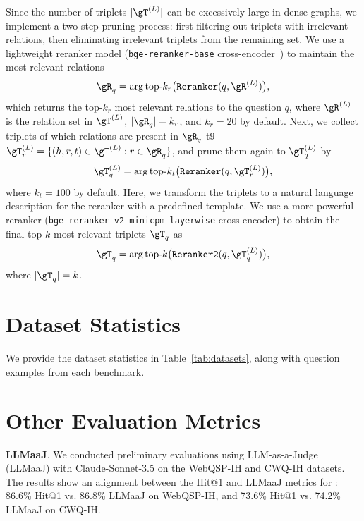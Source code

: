 Since the number of triplets $|\gT^{(L)}|$ can be excessively large in dense graphs, we implement a two-step pruning process: first filtering out triplets with irrelevant relations, then eliminating irrelevant triplets from the remaining set. We use a lightweight reranker model (\texttt{bge-reranker-base} cross-encoder~\citep{bge_embedding}) to maintain the most relevant relations
\begin{equation}
    \gR_{q} = \arg \text{top-}k_r\big(\texttt{Reranker}(q, \gR^{(L)})\big),
\end{equation}
which returns the top-$k_r$ most relevant relations to the question $q$, where $\gR^{(L)}$ is the relation set in $\gT^{(L)}$, $|\gR_{q}| = k_r$, and  $k_r = 20$ by default. 
Next, we collect triplets  of which relations are present in $\gR_{q}$ t9 $\gT_r^{(L)} = \{(h,r,t) \in \gT^{(L)}: r \in \gR_{q}\} $, and prune them again to $\gT_q^{(L)}$ by
\begin{equation}
    \gT_q^{(L)} = \arg \text{top-}k_t\big(\texttt{Reranker}(q, \gT_r^{(L)})\big),
\end{equation}
where $k_t = 100$ by default. Here, we transform the triplets to a natural language description for the reranker with a predefined template.
We use a more powerful reranker (\texttt{bge-reranker-v2-minicpm-layerwise} cross-encoder) to obtain the final top-$k$ most relevant triplets $\gT_q$ as
\begin{equation}
    \gT_{q} = \arg \text{top-}k \big(\texttt{Reranker2}(q, \gT_q^{(L)})\big),
\end{equation}
where $|\gT_{q}| = k$.










\section{Dataset Statistics}
\label{app:data}

We provide the dataset statistics in Table~\ref{tab:datasets}, along with question examples from each benchmark.

\section{Other Evaluation Metrics}

\textbf{LLMaaJ}. We conducted preliminary evaluations using LLM-as-a-Judge (LLMaaJ) with Claude-Sonnet-3.5 on the WebQSP-IH and CWQ-IH datasets. The results show an alignment between the Hit@1 and LLMaaJ metrics for \byokg: 86.6\% Hit@1 vs. 86.8\% LLMaaJ on WebQSP-IH, and 73.6\% Hit@1 vs. 74.2\% LLMaaJ on CWQ-IH.


